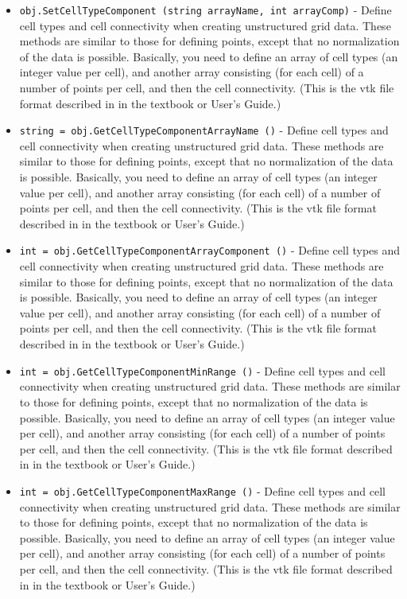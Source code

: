 \begin{itemize}
\item  \verb|obj.SetCellTypeComponent (string arrayName, int arrayComp)| -  Define cell types and cell connectivity when creating unstructured grid
 data.  These methods are similar to those for defining points, except
 that no normalization of the data is possible. Basically, you need to
 define an array of cell types (an integer value per cell), and another
 array consisting (for each cell) of a number of points per cell, and
 then the cell connectivity. (This is the vtk file format described in 
 in the textbook or User's Guide.)

\item  \verb|string = obj.GetCellTypeComponentArrayName ()| -  Define cell types and cell connectivity when creating unstructured grid
 data.  These methods are similar to those for defining points, except
 that no normalization of the data is possible. Basically, you need to
 define an array of cell types (an integer value per cell), and another
 array consisting (for each cell) of a number of points per cell, and
 then the cell connectivity. (This is the vtk file format described in 
 in the textbook or User's Guide.)

\item  \verb|int = obj.GetCellTypeComponentArrayComponent ()| -  Define cell types and cell connectivity when creating unstructured grid
 data.  These methods are similar to those for defining points, except
 that no normalization of the data is possible. Basically, you need to
 define an array of cell types (an integer value per cell), and another
 array consisting (for each cell) of a number of points per cell, and
 then the cell connectivity. (This is the vtk file format described in 
 in the textbook or User's Guide.)

\item  \verb|int = obj.GetCellTypeComponentMinRange ()| -  Define cell types and cell connectivity when creating unstructured grid
 data.  These methods are similar to those for defining points, except
 that no normalization of the data is possible. Basically, you need to
 define an array of cell types (an integer value per cell), and another
 array consisting (for each cell) of a number of points per cell, and
 then the cell connectivity. (This is the vtk file format described in 
 in the textbook or User's Guide.)

\item  \verb|int = obj.GetCellTypeComponentMaxRange ()| -  Define cell types and cell connectivity when creating unstructured grid
 data.  These methods are similar to those for defining points, except
 that no normalization of the data is possible. Basically, you need to
 define an array of cell types (an integer value per cell), and another
 array consisting (for each cell) of a number of points per cell, and
 then the cell connectivity. (This is the vtk file format described in 
 in the textbook or User's Guide.)


\end{itemize}
